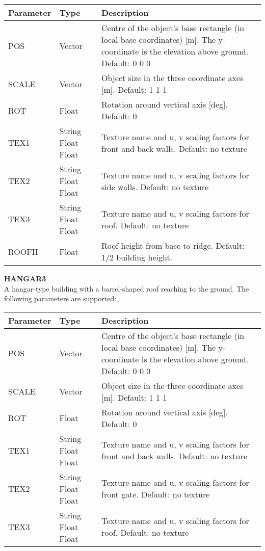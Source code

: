 \documentclass[Orbiter Developer Manual.tex]{subfiles}
\begin{document}
	\begin{longtable}{ |p{}|p{}|p{}| }
	\hline\rule{0pt}{2ex}
	\textbf{Parameter} & \textbf{Type} & \textbf{Description}\\
	\hline\rule{0pt}{2ex}
	POS & Vector & Centre of the object's base rectangle (in local base coordinates) [m]. The y-coordinate is the elevation above ground. Default: 0 0 0\\
	\hline\rule{0pt}{2ex}
	SCALE & Vector & Object size in the three coordinate axes [m]. Default: 1 1 1\\
	\hline\rule{0pt}{2ex}
	ROT & Float & Rotation around vertical axis [deg]. Default: 0\\
	\hline\rule{0pt}{2ex}
	TEX1 & String Float Float & Texture name and u, v scaling factors for front and back walls. Default: no texture\\
	\hline\rule{0pt}{2ex}
	TEX2 & String Float Float & Texture name and u, v scaling factors for side walls. Default: no texture\\
	\hline\rule{0pt}{2ex}
	TEX3 & String Float Float & Texture name and u, v scaling factors for roof. Default: no texture\\
	\hline\rule{0pt}{2ex}
	ROOFH & Float & Roof height from base to ridge. Default: 1/2 building height.\\
	\hline
	\end{longtable}

\noindent
\textbf{HANGAR3}\\
A hangar-type building with a barrel-shaped roof reaching to the ground. The following parameters are supported:

	\begin{longtable}{ |p{}|p{}|p{}| }
	\hline\rule{0pt}{2ex}
	\textbf{Parameter} & \textbf{Type} & \textbf{Description}\\
	\hline\rule{0pt}{2ex}
	POS & Vector & Centre of the object's base rectangle (in local base coordinates) [m]. The y-coordinate is the elevation above ground. Default: 0 0 0\\
	\hline\rule{0pt}{2ex}
	SCALE & Vector & Object size in the three coordinate axes [m]. Default: 1 1 1\\
	\hline\rule{0pt}{2ex}
	ROT & Float & Rotation around vertical axis [deg]. Default: 0\\
	\hline\rule{0pt}{2ex}
	TEX1 & String Float Float & Texture name and u, v scaling factors for front and back walls. Default: no texture\\
	\hline\rule{0pt}{2ex}
	TEX2 & String Float Float & Texture name and u, v scaling factors for front gate. Default: no texture\\
	\hline\rule{0pt}{2ex}
	TEX3 & String Float Float & Texture name and u, v scaling factors for roof. Default: no texture\\
	\hline
	\end{longtable}
\end{document}
